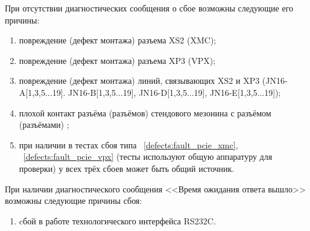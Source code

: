   \label{defects:fault_xmc_sig_diff}
    \subpoint При отсутствии диагностических сообщения о сбое возможны следующие его причины:
      \begin{enumerate}
	\item повреждение (дефект монтажа) разъема XS2 (XMC);
	\item повреждение (дефект монтажа) разъема XP3 (VPX);
	\item повреждение (дефект монтажа) линий, связывающих XS2 и XP3 (JN16-A[1,3,5...19]. JN16-B[1,3,5...19], JN16-D[1,3,5...19], JN16-E[1,3,5...19]);
	\item плохой контакт разъёма (разъёмов) стендового мезонина с разъёмом (разъёмами) \DocProductShortTitle;
	\item при наличии в тестах сбоя типа ~\ref{defects:fault_pcie_xmc}, ~\ref{defects:fault_pcie_vpx} (тесты используют общую аппаратуру для проверки) у всех трёх сбоев может быть общий источник.
      \end{enumerate}
      
    \subpoint При наличии диагностического сообщения <<Время ожидания ответа вышло>> возможны следующие причины сбоя:
      \begin{enumerate}
	\item cбой в работе технологического интерфейса RS232C.
      \end{enumerate} 
      

